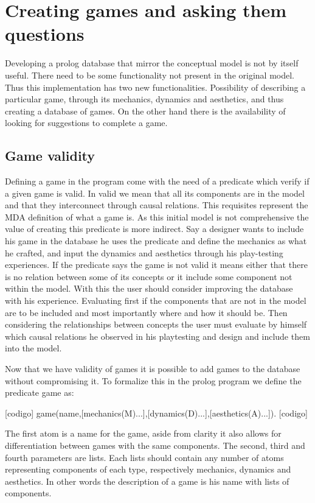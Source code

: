 \section{Creating games and asking them questions}

Developing a prolog database that mirror the conceptual model is not by itself useful. There need to be some functionality not present in the original model. Thus this implementation has two new functionalities. Possibility of describing a particular game, through its mechanics, dynamics and aesthetics, and thus creating a database of games. On the other hand there is the availability of looking for suggestions to complete a game. 

\subsection{Game validity}

Defining a game in the program come with the need of a predicate which verify if a given game is valid. In valid we mean that all its components are in the model and that they interconnect through causal relations. This requisites represent the MDA definition of what a game is. As this initial model is not comprehensive the value of creating this predicate is more indirect. Say a designer wants to include his game in the database he uses the predicate and define the mechanics as what he crafted, and input the dynamics and aesthetics through his play-testing experiences. If the predicate says the game is not valid it means either that there is no relation between some of its concepts or it include some component not within the model. With this the user should consider improving the database with his experience. Evaluating first if the components that are not in the model are to be included and most importantly where and how it should be. Then considering the relationships between concepts the user must evaluate by himself which causal relations he observed in his playtesting and design and include them into the model.

Now that we have validity of games it is possible to add games to the database without compromising it. To formalize this in the prolog program we define the predicate game as:

[codigo] game(name,[mechanics(M)...],[dynamics(D)...],[aesthetics(A)...]). [codigo]

The first atom is a name for the game, aside from clarity it also allows for differentiation between games with the same components. The second, third and fourth parameters are lists. Each lists should contain any number of atoms representing components of each type, respectively mechanics, dynamics and aesthetics. In other words the description of a game is his name with lists of components.

